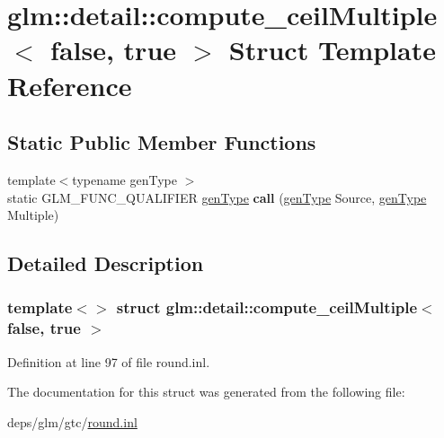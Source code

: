 \hypertarget{structglm_1_1detail_1_1compute__ceilMultiple_3_01false_00_01true_01_4}{}\section{glm\+:\+:detail\+:\+:compute\+\_\+ceil\+Multiple$<$ false, true $>$ Struct Template Reference}
\label{structglm_1_1detail_1_1compute__ceilMultiple_3_01false_00_01true_01_4}
\subsection*{Static Public Member Functions}
\begin{DoxyCompactItemize}
\item 
\mbox{\label{structglm_1_1detail_1_1compute__ceilMultiple_3_01false_00_01true_01_4_a065f8762eb2b48c4f746781fac7ab7f7}} 
{\footnotesize template$<$typename gen\+Type $>$ }\\static G\+L\+M\+\_\+\+F\+U\+N\+C\+\_\+\+Q\+U\+A\+L\+I\+F\+I\+ER \hyperlink{structglm_1_1detail_1_1genType}{gen\+Type} {\bfseries call} (\hyperlink{structglm_1_1detail_1_1genType}{gen\+Type} Source, \hyperlink{structglm_1_1detail_1_1genType}{gen\+Type} Multiple)
\end{DoxyCompactItemize}


\subsection{Detailed Description}
\subsubsection*{template$<$$>$\newline
struct glm\+::detail\+::compute\+\_\+ceil\+Multiple$<$ false, true $>$}



Definition at line 97 of file round.\+inl.



The documentation for this struct was generated from the following file\+:\begin{DoxyCompactItemize}
\item 
deps/glm/gtc/\hyperlink{round_8inl}{round.\+inl}\end{DoxyCompactItemize}
